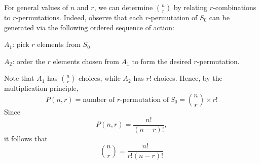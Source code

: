 For general values of \(n\) and \(r\), we can determine \(\binom{n}{r}\) by relating \(r\)-combinations to \(r\)-permutations. Indeed, observe that each \(r\)-permutation of \(S_0\) can be generated via the following ordered sequence of action:

\(A_1\): pick \(r\) elements from \(S_0\)

\(A_2\): order the \(r\) elements chosen from \(A_1\) to form the desired \(r\)-permutation.

Note that \(A_1\) has \(\binom{n}{r}\) choices, while \(A_2\) has \(r!\) choices. Hence, by the multiplication principle,
\[
    P(n, r) = \text{number of }r\text{-permutation of}\ S_0 = \binom{n}{r} \times r!
\]
Since
\[
    P(n, r) = \dfrac{n!}{(n - r)!},
\]
it follows that 
\[
    \binom{n}{r} = \dfrac{n!}{r!(n - r)!}
\]
